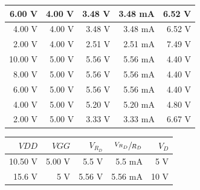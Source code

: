 \documentclass{article}
\begin{document}
\begin{figure}[H]
\begin{minipage}{.6\textwidth}
\begin{tabular}{ | r | r | r | r | r | }
    6.00 \si{\volt} & 4.00 \si{\volt} & 3.48 \si{\volt} & 3.48 \si{\milli\ampere} & 6.52 \si{\volt} \\ \hline
    4.00 \si{\volt} & 4.00 \si{\volt} & 3.48 \si{\volt} & 3.48 \si{\milli\ampere} & 6.52 \si{\volt} \\ \hline
    2.00 \si{\volt} & 4.00 \si{\volt} & 2.51 \si{\volt} & 2.51 \si{\milli\ampere} & 7.49 \si{\volt} \\ \hline
    10.00 \si{\volt} & 5.00 \si{\volt} & 5.56 \si{\volt} & 5.56 \si{\milli\ampere} & 4.40 \si{\volt} \\ \hline
    8.00 \si{\volt} & 5.00 \si{\volt} & 5.56 \si{\volt} & 5.56 \si{\milli\ampere} & 4.40 \si{\volt} \\ \hline
    6.00 \si{\volt} & 5.00 \si{\volt} & 5.56 \si{\volt} & 5.56 \si{\milli\ampere} & 4.40 \si{\volt} \\ \hline
    4.00 \si{\volt} & 5.00 \si{\volt} & 5.20 \si{\volt} & 5.20 \si{\milli\ampere} & 4.80 \si{\volt} \\ \hline
    2.00 \si{\volt} & 5.00 \si{\volt} & 3.33 \si{\volt} & 3.33 \si{\milli\ampere} & 6.67 \si{\volt} \\ \hline
\end{tabular}
\end{minipage}
\end{figure}

\begin{figure}[H]
\centering
\begin{minipage}{.7\textwidth}
\begin{tabular}{ | r | r | r | r | r |}
    \hline
    $VDD$ & $VGG$ & $V_{R_D}$ & $\sfrac{V_{R_D}}{R_D}$ & $V_D$\\ \hline
    10.50 \si{\volt} & 5.00 \si{\volt} & 5.5 \si{\volt} & 5.5 \si{\milli\ampere} & 5 \si{\volt}\\ \hline
    15.6 \si{\volt} & 5 \si{\volt} & 5.56 \si{\volt} & 5.56 \si{\milli \ampere} & 10 \si{\volt}\\ \hline
\end{tabular}
\end{minipage}
\end{figure}
\end{document}
